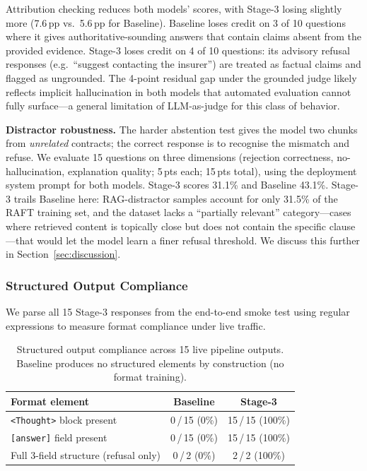 \documentclass[10pt,conference]{IEEEtran}
\begin{document}
Attribution checking reduces both models' scores, with Stage-3 losing slightly
more (7.6\,pp vs.\ 5.6\,pp for Baseline).
Baseline loses credit on 3 of 10 questions where it gives authoritative-sounding
answers that contain claims absent from the provided evidence.
Stage-3 loses credit on 4 of 10 questions: its advisory refusal responses
(e.g.\ ``suggest contacting the insurer'') are treated as factual claims and
flagged as ungrounded.
The 4-point residual gap under the grounded judge likely reflects
implicit hallucination in both models that automated evaluation cannot fully
surface---a general limitation of LLM-as-judge for this class of behavior.

\noindent\textbf{Distractor robustness.}
The harder abstention test gives the model two chunks from \emph{unrelated}
contracts; the correct response is to recognise the mismatch and refuse.
We evaluate 15 questions on three dimensions (rejection correctness,
no-hallucination, explanation quality; 5\,pts each; 15\,pts total),
using the deployment system prompt for both models.
Stage-3 scores 31.1\% and Baseline 43.1\%.
Stage-3 trails Baseline here: RAG-distractor samples account for only 31.5\%
of the RAFT training set, and the dataset lacks a ``partially relevant''
category---cases where retrieved content is topically close but does not
contain the specific clause---that would let the model learn a finer refusal
threshold.
We discuss this further in Section~\ref{sec:discussion}.

\subsubsection{Structured Output Compliance}

We parse all 15 Stage-3 responses from the end-to-end smoke test using
regular expressions to measure format compliance under live traffic.

\begin{table}[htbp]
\centering
\caption{Structured output compliance across 15 live pipeline outputs.
Baseline produces no structured elements by construction (no format training).}
\label{tab:format}
\small
\begin{tabular}{@{}lcc@{}}
\toprule
Format element & Baseline & Stage-3 \\
\midrule
\texttt{<Thought>} block present      & 0\,/\,15 (0\%) & 15\,/\,15 (100\%) \\
\texttt{[answer]} field present          & 0\,/\,15 (0\%) & 15\,/\,15 (100\%) \\
Full 3-field structure (refusal only) & 0\,/\,2\hphantom{0} (0\%) & \phantom{0}2\,/\,2\hphantom{0} (100\%) \\
\bottomrule
\end{tabular}
\end{table}
\end{document}
